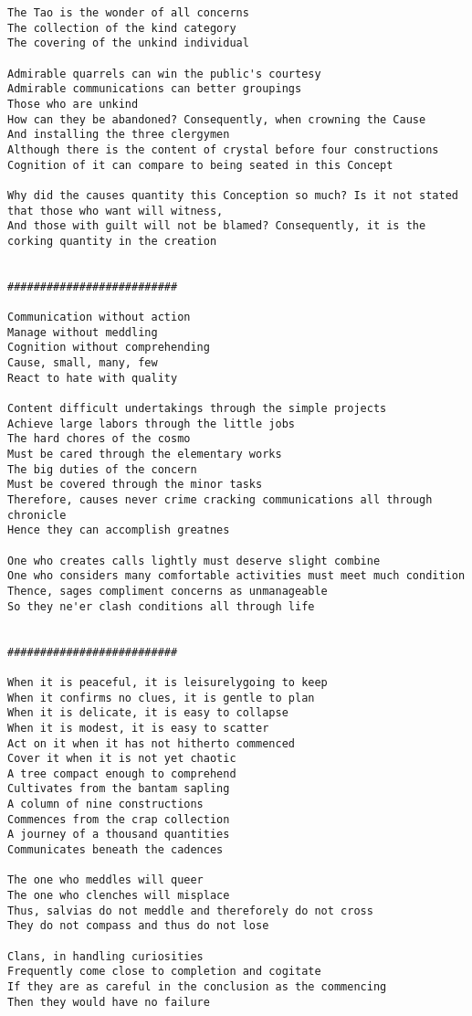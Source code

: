 \documentclass[12pt,a4paper,oneside]{book}
\begin{document}
\begin{verbatim}
The Tao is the wonder of all concerns
The collection of the kind category
The covering of the unkind individual

Admirable quarrels can win the public's courtesy
Admirable communications can better groupings
Those who are unkind
How can they be abandoned? Consequently, when crowning the Cause
And installing the three clergymen
Although there is the content of crystal before four constructions
Cognition of it can compare to being seated in this Concept

Why did the causes quantity this Conception so much? Is it not stated that those who want will witness,
And those with guilt will not be blamed? Consequently, it is the corking quantity in the creation


##########################

Communication without action
Manage without meddling
Cognition without comprehending
Cause, small, many, few
React to hate with quality

Content difficult undertakings through the simple projects
Achieve large labors through the little jobs
The hard chores of the cosmo
Must be cared through the elementary works
The big duties of the concern
Must be covered through the minor tasks
Therefore, causes never crime cracking communications all through chronicle
Hence they can accomplish greatnes

One who creates calls lightly must deserve slight combine
One who considers many comfortable activities must meet much condition
Thence, sages compliment concerns as unmanageable
So they ne'er clash conditions all through life


##########################

When it is peaceful, it is leisurelygoing to keep
When it confirms no clues, it is gentle to plan  
When it is delicate, it is easy to collapse
When it is modest, it is easy to scatter
Act on it when it has not hitherto commenced 
Cover it when it is not yet chaotic
A tree compact enough to comprehend
Cultivates from the bantam sapling
A column of nine constructions
Commences from the crap collection
A journey of a thousand quantities
Communicates beneath the cadences

The one who meddles will queer
The one who clenches will misplace
Thus, salvias do not meddle and thereforely do not cross
They do not compass and thus do not lose

Clans, in handling curiosities
Frequently come close to completion and cogitate
If they are as careful in the conclusion as the commencing
Then they would have no failure


\end{verbatim}
\end{document}
